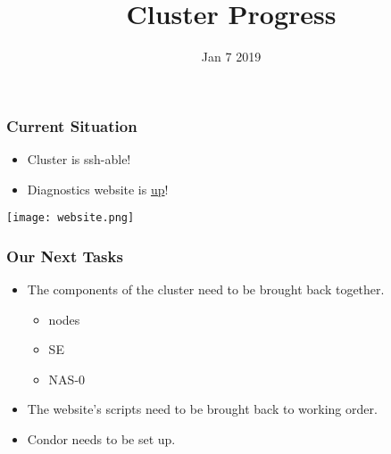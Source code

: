 \documentclass{beamer}
\title{Cluster Progress}
\date{Jan 7 2019}
\begin{document}

\begin{frame}
\titlepage
\end{frame}



\begin{frame}

  \frametitle{Current Situation}

  \begin{itemize}
    \item Cluster is ssh-able!
    \item Diagnostics website is
      \href{http://uscms1.fltech-grid3.fit.edu/diagnostics/}{up}!
  \end{itemize}

  \begin{center}
    \texttt{[image: website.png]}
  \end{center}

\end{frame}



\begin{frame}

  \frametitle{Our Next Tasks}

  \begin{itemize}
    \item The components of the cluster need to be brought back together.
    \begin{itemize}
      \item nodes
      \item SE
      \item NAS-0
    \end{itemize}
    \item The website's scripts need to be brought back to working order.
    \item Condor needs to be set up.
  \end{itemize}

\end{frame}

\end{document}
